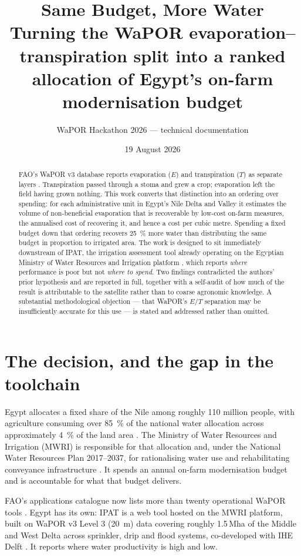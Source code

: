 \documentclass[11pt,a4paper]{article}
\title{\color{nile}\textbf{Same Budget, More Water}\\[2mm]
\large\normalfont Turning the WaPOR evaporation--transpiration split into a
ranked allocation of Egypt's on-farm modernisation budget}
\author{WaPOR Hackathon 2026 --- technical documentation}
\date{19 August 2026}
\begin{document}
\maketitle

\begin{abstract}
\noindent
FAO's WaPOR v3 database reports evaporation ($E$) and transpiration ($T$) as
separate layers \citep{fao_wapor_v3}. Transpiration passed through a stoma and
grew a crop; evaporation left the field having grown nothing. This work converts
that distinction into an ordering over spending: for each administrative unit in
Egypt's Nile Delta and Valley it estimates the volume of non-beneficial
evaporation that is recoverable by low-cost on-farm measures, the annualised cost
of recovering it, and hence a cost per cubic metre. Spending a fixed budget down
that ordering recovers \SI{25}{\percent} more water than distributing the same
budget in proportion to irrigated area. The work is designed to sit immediately
downstream of IPAT, the irrigation assessment tool already operating on the
Egyptian Ministry of Water Resources and Irrigation platform \citep{fao_ipat},
which reports \emph{where} performance is poor but not \emph{where to spend}.
Two findings contradicted the authors' prior hypothesis and are reported in full,
together with a self-audit of how much of the result is attributable to the
satellite rather than to coarse agronomic knowledge. A substantial methodological
objection --- that WaPOR's $E$/$T$ separation may be insufficiently accurate for
this use \citep{chukalla2022} --- is stated and addressed rather than omitted.
\end{abstract}

\section{The decision, and the gap in the toolchain}

Egypt allocates a fixed share of the Nile among roughly 110 million people, with
agriculture consuming over \SI{85}{\percent} of the national water allocation
across approximately \SI{4}{\percent} of the land area \citep{ayyad2019}. The
Ministry of Water Resources and Irrigation (MWRI) is responsible for that
allocation and, under the National Water Resources Plan 2017--2037, for
rationalising water use and rehabilitating conveyance infrastructure
\citep{nwrp2037}. It spends an annual on-farm modernisation budget and is
accountable for what that budget delivers.

FAO's applications catalogue now lists more than twenty operational WaPOR tools
\citep{fao_catalogue}. Egypt has its own: IPAT is a web tool hosted on the MWRI
platform, built on WaPOR v3 Level 3 (\SI{20}{\metre}) data covering roughly
1.5\,Mha of the Middle and West Delta across sprinkler, drip and
flood systems, co-developed with IHE Delft \citep{fao_ipat}. It reports where
water productivity is high and low.
\end{document}
